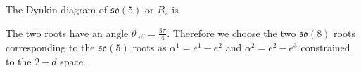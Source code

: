 \documentclass[main.tex]{subfiles}
\begin{document}
The Dynkin diagram of $\mathfrak{so}(5)$ or $B_2$ is
\begin{figure}[H] 
\centering
\end{figure}

The two roots have an angle $\theta_{\alpha\beta}=\frac{3\pi}{4}$. Therefore we choose the two $\mathfrak{so}(8)$ roots corresponding to the $\mathfrak{so}(5)$ roots as $\alpha^1=e^1-e^2$ and $\alpha^2=e^2-e^3$ constrained to the $2-d$ space.

\end{document}
